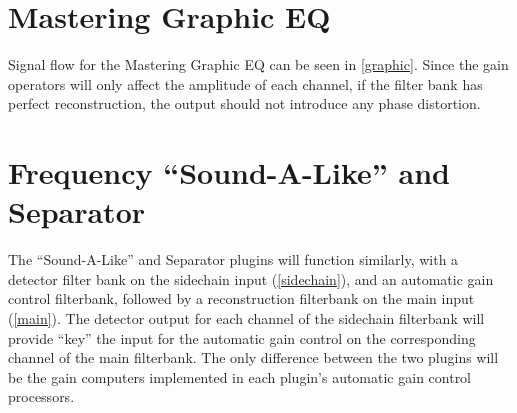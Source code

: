 \documentclass{article}
\begin{document}
\begin{figure*}[ht]
    \center
    \caption{\label{graphic}{\it Signal flow for Graphic EQ.}}
\end{figure*}

\section{Mastering Graphic EQ}
Signal flow for the Mastering Graphic EQ can be seen in
\cref{graphic}. Since the gain operators will only affect
the amplitude of each channel, if the filter
bank has perfect reconstruction, the output should not
introduce any phase distortion.

\section{Frequency ``Sound-A-Like'' and Separator}
The ``Sound-A-Like'' and Separator plugins will function similarly, with a detector
filter bank on the sidechain input (\cref{sidechain}), and an automatic gain control
filterbank, followed by a reconstruction filterbank on the main input (\cref{main}).
The detector output for each channel of the sidechain filterbank will
provide ``key'' the input for the automatic gain control on the corresponding
channel of the main filterbank. The only difference between the two plugins
will be the gain computers implemented in each plugin's automatic gain control
processors.
\end{document}

